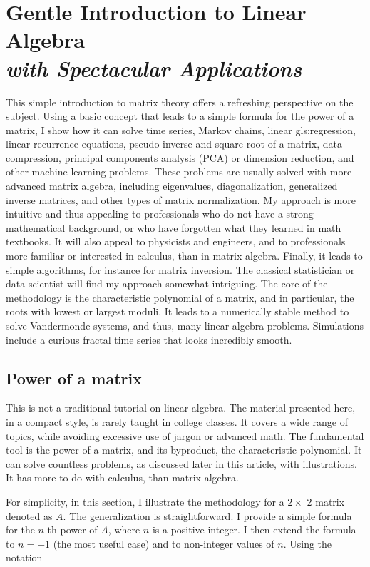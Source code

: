 \documentclass[oneside,10pt]{book}
\newcommand\Chapter[2]{
  \chapter[#1]{#1\\[2ex]\Large\itshape#2}
}
\begin{document}
\Chapter{Gentle Introduction to Linear Algebra}{with Spectacular Applications}\label{chapterlinear}

This simple introduction to matrix theory offers a refreshing perspective on the subject. Using a basic concept that leads to a simple formula for the power of a matrix, I show how it can solve time series, Markov chains, linear \gls{gls:regression}, linear recurrence equations, pseudo-inverse and square root of a matrix, data compression, principal components analysis (PCA) or dimension reduction, and other machine learning problems. These problems are usually solved with more advanced matrix algebra, including eigenvalues, diagonalization, generalized inverse matrices, and other types of matrix normalization. My approach is more intuitive and thus appealing to professionals who do not have a strong mathematical background, or who have forgotten what they learned in math textbooks. It will also appeal to physicists and engineers, and to professionals more familiar or interested in calculus, than in matrix algebra. Finally, it leads to simple algorithms, for instance for matrix inversion. The classical statistician or data scientist will find my approach somewhat intriguing. The core of the methodology is the characteristic polynomial of a matrix, and in particular, the roots with lowest or largest moduli. It leads to a numerically stable method to solve Vandermonde systems, and thus, many linear algebra problems. Simulations include a curious fractal time series that looks incredibly smooth.






\section{Power of a matrix}

This is not a traditional tutorial on linear algebra. The material presented here, in a compact style, is rarely taught in college classes. It covers a wide range of topics, while avoiding excessive use of jargon or advanced math. The fundamental tool is the power of a matrix, and its byproduct, the characteristic polynomial. It can solve countless problems, as discussed later in this article, with illustrations. It has more to do with calculus, than matrix algebra.

For simplicity, in this section, I illustrate the methodology for a $2 \times$ 2 matrix denoted as $A$. The generalization is straightforward. I provide a simple formula for the $n$-th power of $A$, where $n$ is a positive integer. I then extend the formula
to $n = -1$ (the most useful case) and to non-integer values of $n$.
Using the notation
\end{document}
